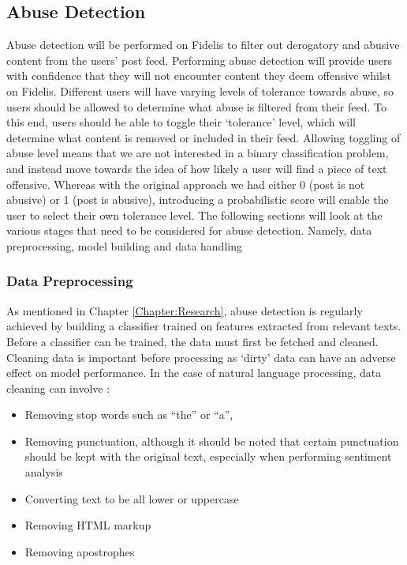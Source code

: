 \subsection{Abuse Detection}
\label{sec:abuse-detection}
Abuse detection will be performed on Fidelis to filter out derogatory and abusive content from the users' post feed. Performing abuse detection will provide users with confidence that they will not encounter content they deem offensive whilst on Fidelis. Different users will have varying levels of tolerance towards abuse, so users should be allowed to determine what abuse is filtered from their feed. To this end, users should be able to toggle their `tolerance' level, which will determine what content is removed or included in their feed. Allowing toggling of abuse level means that we are not interested in a binary classification problem, and instead move towards the idea of how likely a user will find a piece of text offensive. Whereas with the original approach we had either 0 (post is not abusive) or 1 (post is abusive), introducing a probabilistic score will enable the user to select their own tolerance level. The following sections will look at the various stages that need to be considered for abuse detection. Namely, data preprocessing, model building and data handling

\subsubsection{Data Preprocessing}
As mentioned in Chapter \ref{Chapter:Research}, abuse detection is regularly achieved by building a classifier trained on features extracted from relevant texts. Before a classifier can be trained, the data must first be fetched and cleaned. Cleaning data is important before processing as `dirty' data can have an adverse effect on model performance. In the case of natural language processing, data cleaning can involve \cite{han2011data}:
\begin{itemize}
\item Removing stop words such as ``the'' or ``a'', 
\item Removing punctuation, although it should be noted that certain punctuation should be kept with the original text, especially when performing sentiment analysis
\item Converting text to be all lower or uppercase
\item Removing HTML markup
\item Removing apostrophes
\end{itemize}

